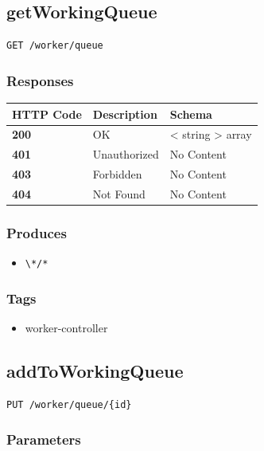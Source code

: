 \subsection{getWorkingQueue}\label{getworkingqueue}

\begin{verbatim}
GET /worker/queue
\end{verbatim}

\subsubsection{Responses}\label{responses-23}

\begin{longtable}[]{@{}lll@{}}
\toprule
HTTP Code & Description & Schema\tabularnewline
\midrule
\endhead
\textbf{200} & OK & \textless{} string \textgreater{}
array\tabularnewline
\textbf{401} & Unauthorized & No Content\tabularnewline
\textbf{403} & Forbidden & No Content\tabularnewline
\textbf{404} & Not Found & No Content\tabularnewline
\bottomrule
\end{longtable}

\subsubsection{Produces}\label{produces-23}

\begin{itemize}
\tightlist
\item
  \texttt{\textbackslash{}*/*}
\end{itemize}

\subsubsection{Tags}\label{tags-23}

\begin{itemize}
\tightlist
\item
  worker-controller
\end{itemize}

\subsection{addToWorkingQueue}\label{addtoworkingqueue}

\begin{verbatim}
PUT /worker/queue/{id}
\end{verbatim}

\subsubsection{Parameters}\label{parameters-20}

